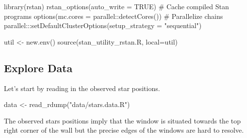 \documentclass[
  letterpaper,
  DIV=11,
  numbers=noendperiod]{scrartcl}
\newenvironment{Shaded}{\begin{snugshade}}{\end{snugshade}}
\newcommand{\AttributeTok}[1]{\textcolor[rgb]{0.40,0.45,0.13}{#1}}
\newcommand{\CommentTok}[1]{\textcolor[rgb]{0.37,0.37,0.37}{#1}}
\newcommand{\ConstantTok}[1]{\textcolor[rgb]{0.56,0.35,0.01}{#1}}
\newcommand{\FunctionTok}[1]{\textcolor[rgb]{0.28,0.35,0.67}{#1}}
\newcommand{\NormalTok}[1]{\textcolor[rgb]{0.00,0.23,0.31}{#1}}
\newcommand{\OtherTok}[1]{\textcolor[rgb]{0.00,0.23,0.31}{#1}}
\newcommand{\SpecialCharTok}[1]{\textcolor[rgb]{0.37,0.37,0.37}{#1}}
\newcommand{\StringTok}[1]{\textcolor[rgb]{0.13,0.47,0.30}{#1}}
\begin{document}
\begin{Shaded}
\begin{Highlighting}[]
\FunctionTok{library}\NormalTok{(rstan)}
\FunctionTok{rstan\_options}\NormalTok{(}\AttributeTok{auto\_write =} \ConstantTok{TRUE}\NormalTok{)            }\CommentTok{\# Cache compiled Stan programs}
\FunctionTok{options}\NormalTok{(}\AttributeTok{mc.cores =}\NormalTok{ parallel}\SpecialCharTok{::}\FunctionTok{detectCores}\NormalTok{()) }\CommentTok{\# Parallelize chains}
\NormalTok{parallel}\SpecialCharTok{:::}\FunctionTok{setDefaultClusterOptions}\NormalTok{(}\AttributeTok{setup\_strategy =} \StringTok{"sequential"}\NormalTok{)}

\NormalTok{util }\OtherTok{\textless{}{-}} \FunctionTok{new.env}\NormalTok{()}
\FunctionTok{source}\NormalTok{(}\StringTok{\textquotesingle{}stan\_utility\_rstan.R\textquotesingle{}}\NormalTok{, }\AttributeTok{local=}\NormalTok{util)}
\end{Highlighting}
\end{Shaded}

\subsection{Explore Data}\label{explore-data}

Let's start by reading in the observed star positions.

\begin{Shaded}
\begin{Highlighting}[]
\NormalTok{data }\OtherTok{\textless{}{-}} \FunctionTok{read\_rdump}\NormalTok{(}\StringTok{"data/stars.data.R"}\NormalTok{)}
\end{Highlighting}
\end{Shaded}

The observed stars positions imply that the window is situated towards
the top right corner of the wall but the precise edges of the windows
are hard to resolve.
\end{document}
